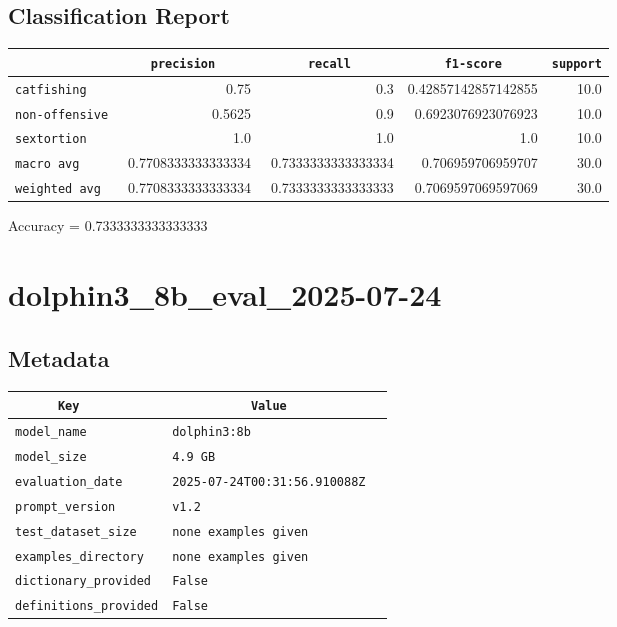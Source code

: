 \documentclass{article}
\begin{document}
\subsection{Classification Report}

\begin{center}
\begin{tabular}{l | r | r | r | r} \hline
    \verb|            | & \verb|    precision     | & \verb|      recall      | & \verb|     f1-score     | & \verb|support| \\ \hline
    \hline
    \verb|catfishing | & 0.75 & 0.3 & 0.42857142857142855 &    10.0 \\ \hline
    \verb|non-offensive| & 0.5625 & 0.9 & 0.6923076923076923 &    10.0 \\ \hline
    \verb|sextortion | & 1.0 & 1.0 & 1.0 &    10.0 \\ \hline
    \verb|macro avg  | & 0.7708333333333334 & 0.7333333333333334 & 0.706959706959707 &    30.0 \\ \hline
    \verb|weighted avg| & 0.7708333333333334 & 0.7333333333333333 & 0.7069597069597069 &    30.0 \\ \hline
\end{tabular}
\end{center}

\begin{center}
Accuracy = 0.7333333333333333
\end{center}

\section{dolphin3\_8b\_eval\_2025-07-24}
\subsection{Metadata}

\begin{center}
\begin{tabular}{l | l} \hline
    \verb|      Key      | & \verb|           Value           | \\ \hline
    \hline
    \verb|model_name    | & \verb|dolphin3:8b                  | \\ \hline
    \verb|model_size    | & \verb|4.9 GB                       | \\ \hline
    \verb|evaluation_date| & \verb|2025-07-24T00:31:56.910088Z  | \\ \hline
    \verb|prompt_version| & \verb|v1.2                         | \\ \hline
    \verb|test_dataset_size| & \verb|none examples given          | \\ \hline
    \verb|examples_directory| & \verb|none examples given          | \\ \hline
    \verb|dictionary_provided| & \verb|False                        | \\ \hline
    \verb|definitions_provided| & \verb|False                        | \\ \hline
\end{tabular}
\end{center}
\end{document}
